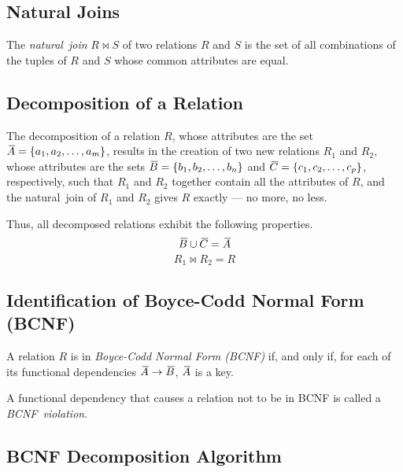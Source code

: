 \subsection{Natural Joins}

The \emph{natural~join} \( R \bowtie S \) of two relations \( R \) and \( S \) is the set of all combinations of the tuples of \( R \) and \( S \) whose common attributes are equal.


\subsection{Decomposition of a Relation}

The decomposition of a relation \( R \), whose attributes are the set \( {}\mkern3mu\overline{\mkern-3muA} = \left\{ a_1, a_2, \ldots, a_m \right\} \), results in the creation of two new relations \( R_1 \) and \( R_2 \), whose attributes are the sets \( {}\mkern3mu\overline{\mkern-3muB} = \left\{ b_1, b_2, \ldots, b_n \right\} \) and \( {}\mkern3mu\overline{\mkern-3muC} = \left\{ c_1, c_2, \ldots, c_p \right\} \), respectively, such that \( R_1 \) and \( R_2 \) together contain all the attributes of \( R \), and the natural~join of \( R_1 \) and \( R_2 \) gives \( R \) exactly --- no more, no less.

Thus, all decomposed relations exhibit the following properties.
\begin{equation*}
  {}\mkern3mu\overline{\mkern-3muB} \cup {}\mkern3mu\overline{\mkern-3muC} = {}\mkern3mu\overline{\mkern-3muA}
\end{equation*}
\begin{equation*}
  R_1 \bowtie R_2 = R
\end{equation*}

\subsection{Identification of Boyce-Codd Normal Form (BCNF)}

A relation \( R \) is in \emph{Boyce-Codd Normal Form (BCNF)} if, and only if, for each of its functional dependencies \( {}\mkern3mu\overline{\mkern-3muA} \rightarrow {}\mkern3mu\overline{\mkern-3muB} \), \( {}\mkern3mu\overline{\mkern-3muA} \) is a key.

A functional dependency that causes a relation not to be in BCNF is called a \emph{BCNF~violation}.

\subsection{BCNF Decomposition Algorithm}

